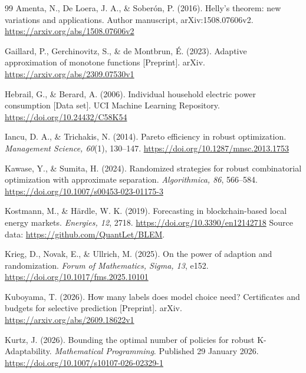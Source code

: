 \begin{figure}[htbp]
\label{fig:practical-guarantee-replay}
\end{figure}

\begin{thebibliography}{99}
Amenta, N., De Loera, J. A., \& Sober\'on, P. (2016). Helly's theorem: new variations
and applications. Author manuscript, arXiv:1508.07606v2.
\url{https://arxiv.org/abs/1508.07606v2}

Gaillard, P., Gerchinovitz, S., \& de Montbrun, {\'E}. (2023).
Adaptive approximation of monotone functions [Preprint].
arXiv. \url{https://arxiv.org/abs/2309.07530v1}

Hebrail, G., \& Berard, A. (2006). Individual household electric power
consumption [Data set]. UCI Machine Learning Repository.
\url{https://doi.org/10.24432/C58K54}

Iancu, D. A., \& Trichakis, N. (2014). Pareto efficiency in robust optimization.
\emph{Management Science, 60}(1), 130--147.
\url{https://doi.org/10.1287/mnsc.2013.1753}

Kawase, Y., \& Sumita, H. (2024). Randomized strategies for robust
combinatorial optimization with approximate separation.
\emph{Algorithmica, 86}, 566--584.
\url{https://doi.org/10.1007/s00453-023-01175-3}

Kostmann, M., \& H\"ardle, W. K. (2019). Forecasting in blockchain-based
local energy markets. \emph{Energies, 12}, 2718.
\url{https://doi.org/10.3390/en12142718}
Source data: \url{https://github.com/QuantLet/BLEM}.

Krieg, D., Novak, E., \& Ullrich, M. (2025).
On the power of adaption and randomization.
\emph{Forum of Mathematics, Sigma, 13}, e152.
\url{https://doi.org/10.1017/fms.2025.10101}

Kuboyama, T. (2026).
How many labels does model choice need? Certificates and budgets for selective
prediction [Preprint].
arXiv. \url{https://arxiv.org/abs/2609.18622v1}

Kurtz, J. (2026). Bounding the optimal number of policies for robust
K-Adaptability. \emph{Mathematical Programming}. Published 29 January 2026.
\url{https://doi.org/10.1007/s10107-026-02329-1}


\end{thebibliography}
